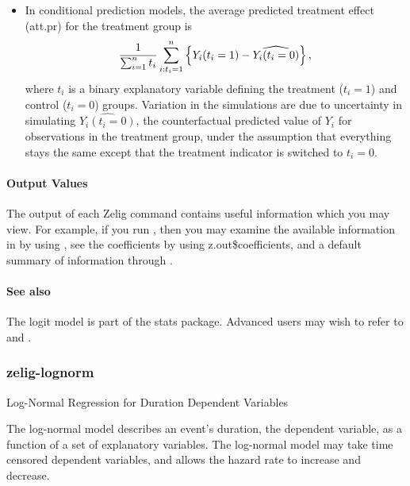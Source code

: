 \documentclass[letterpaper,10pt,english]{sphinxmanual}
\begin{document}
\begin{itemize}
\item {} 
In conditional prediction models, the average predicted treatment
effect (att.pr) for the treatment group is
\begin{gather}
\begin{split}\frac{1}{\sum_{i=1}^n t_i}\sum_{i:t_i=1}^n \left\{ Y_i(t_i=1) -
      \widehat{Y_i(t_i=0)}\right\},\end{split}\notag
\end{gather}
where \(t_i\) is a binary explanatory variable defining the
treatment (\(t_i=1\)) and control (\(t_i=0\)) groups.
Variation in the simulations are due to uncertainty in simulating
\(\widehat{Y_i(t_i=0)}\), the counterfactual predicted value of
\(Y_i\) for observations in the treatment group, under the
assumption that everything stays the same except that the treatment
indicator is switched to \(t_i=0\).

\end{itemize}


\paragraph{Output Values}
\label{zelig-logit:output-values}
The output of each Zelig command contains useful information which you
may view. For example, if you run
, then you may examine the
available information in  by using , see the
coefficients by using z.out\$coefficients, and a default summary of
information through .


\paragraph{See also}
\label{zelig-logit:see-also}
The logit model is part of the stats package. Advanced users may
wish to refer to  and .


\subsubsection{zelig-lognorm}
\label{zelig-lognorm:zelig-lognorm}\label{zelig-lognorm::doc}\label{zelig-lognorm:zlognorm}
Log-Normal Regression for Duration Dependent Variables

The log-normal model describes an event’s duration, the dependent
variable, as a function of a set of explanatory variables. The
log-normal model may take time censored dependent variables, and allows
the hazard rate to increase and decrease.
\end{document}

